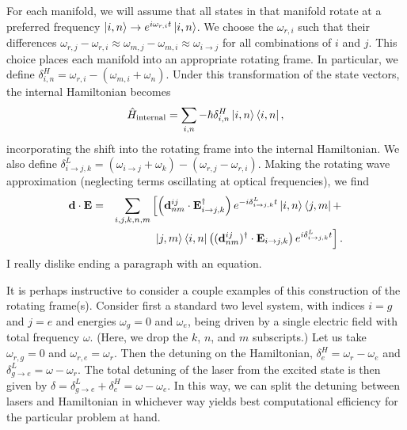 \documentclass[final,5p,times,twocolumn]{elsarticle}
\begin{document}
For each manifold, we will assume that all states in that manifold rotate at a preferred frequency $\ket{i,n} \rightarrow e^{i \omega_{r,i} t}\ket{i, n}$.  
We choose the $\omega_{r,i}$ such that their differences $\omega_{r,j}-\omega_{r,i} \approx \omega_{m,j}-\omega_{m,i} \approx \omega_{i\rightarrow j}$ for all combinations of $i$ and $j$.
This choice places each manifold into an appropriate rotating frame.
In particular, we define $\delta^H_{i, n} = \omega_{r,i}-(\omega_{m, i}+\omega_n)$.
Under this transformation of the state vectors, the internal Hamiltonian becomes
\begin{equation}
	\hat{H}_\text{internal} = \sum_{i,n}-\hbar \delta^H_{i, n} \ket{i,n}\Bra{i, n},
\end{equation}
incorporating the shift into the rotating frame into the internal Hamiltonian.  We also define $\delta^L_{i\rightarrow j, k} = (\omega_{i\rightarrow j} + \omega_k) - (\omega_{r,j} - \omega_{r,i})$.  Making the rotating wave approximation (neglecting terms oscillating at optical frequencies), we find
\begin{eqnarray}
	\mathbf{d}\cdot\mathbf{E} & = & \sum_{i, j, k, n, m}\left[\left(\mathbf{d}^{ij}_{nm}\cdot\mathbf{E}^\dagger_{i\rightarrow j,k} \right) e^{-i\delta^L_{i\rightarrow j, k}  t} \ket{i,n}\Bra{j,m} + \right. \nonumber \\
	& & \left. \ket{j,m}\Bra{i,n} \left((\mathbf{d}^{ij}_{nm})^\dagger \cdot \mathbf{E}_{i\rightarrow j,k}\right)e^{i\delta^L_{i\rightarrow j, k}t}\right]. \label{eq:d_dot_E}
\end{eqnarray}
I really dislike ending a paragraph with an equation.

It is perhaps instructive to consider a couple examples of this construction of the rotating frame(s).  Consider first a standard two level system, with indices $i=g$ and $j=e$ and energies $\omega_g=0$ and $\omega_e$, being driven by a single electric field with total frequency $\omega$.   (Here, we drop the $k$, $n$, and $m$ subscripts.)  Let us take $\omega_{r,g}=0$ and $\omega_{r,e}=\omega_r$.  Then the detuning on the Hamiltonian, $\delta^{H}_e = \omega_r - \omega_e$ and $\delta^L_{g\rightarrow e} = \omega - \omega_r$.  The total detuning of the laser from the excited state is then given by $\delta = \delta^L_{g\rightarrow e}+\delta^H_e = \omega-\omega_e$.  In this way, we can split the detuning between lasers and Hamiltonian in whichever way yields best computational efficiency for the particular problem at hand.
\end{document}
